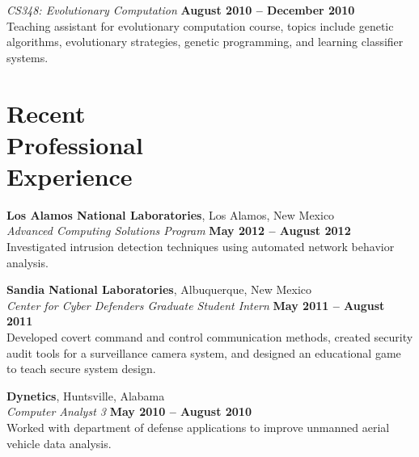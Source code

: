 \documentclass[margin,line]{resume}
\begin{document}
\begin{resume}
    \textsl{CS348: Evolutionary Computation} \hfill \textbf{August 2010 -- December 2010}\\
    Teaching assistant for evolutionary computation course,
    topics include genetic algorithms, evolutionary strategies, genetic programming, and learning classifier systems.

    \section{\mysidestyle Recent\\Professional\\Experience}

    \textbf{Los Alamos National Laboratories}, Los Alamos, New Mexico \vspace{2mm}\\\vspace{1mm}%
    \textsl{Advanced Computing Solutions Program} \hfill \textbf{May 2012 -- August 2012}\\
    Investigated intrusion detection techniques using automated network behavior analysis.
    
    \textbf{Sandia National Laboratories}, Albuquerque, New Mexico \vspace{2mm}\\\vspace{1mm}%
    \textsl{Center for Cyber Defenders Graduate Student Intern} \hfill \textbf{May 2011 -- August 2011}\\
    Developed covert command and control communication methods, created security audit tools for a
    surveillance camera system, and designed an educational game to teach secure system design.
    
    \textbf{Dynetics}, Huntsville, Alabama \vspace{2mm}\\\vspace{1mm}%
    \textsl{Computer Analyst 3} \hfill \textbf{May 2010 -- August 2010}\\
    Worked with department of defense applications to improve unmanned aerial vehicle data analysis. 

    \begin{comment}
    \textbf{AT\&T}, Saint Louis, Missouri \vspace{2mm}\\\vspace{1mm}%
    \textsl{Summer Technical Intern} \hfill \textbf{May 2008 -- August 2008}\\
    Developed automated service detection to ensure all pertinent applications installed on a server
    were restarted at server reboot.  Modernized legacy software performing phone number database queries.
    \end{comment}
    

\end{resume}
\end{document}
